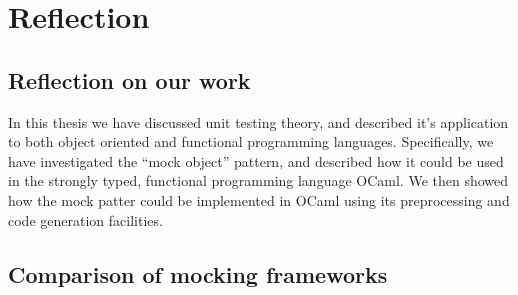 \chapter{Reflection}
\label{reflection}

\section{Reflection on our work}


In this thesis we have discussed unit testing theory, and described
it's application to both object oriented and functional programming
languages. Specifically, we have investigated the ``mock object''
pattern, and described how it could be used in the strongly typed,
functional programming language OCaml. We then showed how the mock
patter could be implemented in OCaml using its preprocessing and code
generation facilities.

\section{Comparison of mocking frameworks}
\label{application:comparison}



